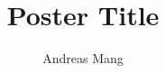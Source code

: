 \documentclass[plainsections,30pt]{sciposter}
\author{Andreas Mang}
\institute{Department of Mathematics, University of Houston, Houston, TX, USA}
\title{Poster Title}
\begin{document}
\begin{minipage}[c]{\titlewidth} %
        \normalsize
        \begin{spacing}{0.8} %
            \color{titlecolor}\titlesize\bf\thetitle
            \vspace{-\baselineskip}
        \end{spacing}
        \vspace{0.6\titleskip}
        \normalsize
        \begin{spacing}{1.25} %
            \authorsize\bf\theauthor
            \vspace{-\baselineskip}
        \end{spacing}
        \vspace{0.6\titleskip}
        \normalsize
        \begin{spacing}{1} %
            \instsize\theinstitute
        \end{spacing}
\end{minipage}
\hfill
\begin{minipage}[c]{\logowidth} %
\raggedleft\printrightlogo
\end{minipage}
\vspace{\titleskip}
\end{document}
